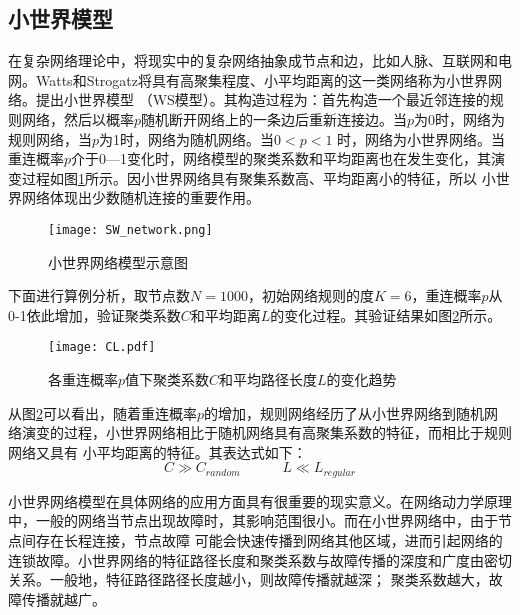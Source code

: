 \subsection{小世界模型}
\label{sec:windEffects}
在复杂网络理论中，将现实中的复杂网络抽象成节点和边，比如人脉、互联网和电网。Watts和Strogatz将具有高聚集程度、小平均距离的这一类网络称为小世界网络\cite{refsWS}。提出小世界模型
（WS模型）。其构造过程为：首先构造一个最近邻连接的规则网络，然后以概率$p$随机断开网络上的一条边后重新连接边。当$p$为0时，网络为规则网络，当$p$为1时，网络为随机网络。当$0<p<1$
时，网络为小世界网络。当重连概率$p$介于0—1变化时，网络模型的聚类系数和平均距离也在发生变化，其演变过程如图\ref{fig:SW}所示。因小世界网络具有聚集系数高、平均距离小的特征，所以
小世界网络体现出少数随机连接的重要作用。
\begin{figure}[H] %
    \centering
    \texttt{[image: SW\_network.png]}
    \caption{小世界网络模型示意图}
    \label{fig:SW}
  \end{figure}

下面进行算例分析，取节点数$N = 1000$，初始网络规则的度$K = 6$，重连概率$p$从0-1依此增加，验证聚类系数$C$和平均距离$L$的变化过程。其验证结果如图\ref{fig:CL}所示。
\begin{figure}[H] %
    \centering
    \texttt{[image: CL.pdf]}
    \caption{各重连概率$p$值下聚类系数$C$和平均路径长度$L$的变化趋势}
    \label{fig:CL}
\end{figure}

从图\ref{fig:CL}可以看出，随着重连概率$p$的增加，规则网络经历了从小世界网络到随机网络演变的过程，小世界网络相比于随机网络具有高聚集系数的特征，而相比于规则网络又具有
小平均距离的特征。其表达式如下：
\begin{equation}
\label{equ:chap2:CL}
 C\gg C_{random} \quad \quad\quad L \ll L_{regular}
\end{equation}

小世界网络模型在具体网络的应用方面具有很重要的现实意义。在网络动力学原理中，一般的网络当节点出现故障时，其影响范围很小。而在小世界网络中，由于节点间存在长程连接，节点故障
可能会快速传播到网络其他区域，进而引起网络的连锁故障。小世界网络的特征路径长度和聚类系数与故障传播的深度和广度由密切关系。一般地，特征路径路径长度越小，则故障传播就越深；
聚类系数越大，故障传播就越广\cite{refsWS1}。


